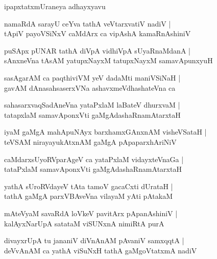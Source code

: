 \documentclass[twoside,12pt,openright]{book}
\newcounter{shloka}[chapter]
\begin{document}
\begin{center}
ipapxtatxmUraneya adhayxyavu
\end{center}

\begin{shloka}%
namaRdA sarayU ceYva tathA veVtarxvatiV nadiV |\\
tApiV payoVSiNxV caMdArx ca vipAshA kamaRnAshiniV 
\end{shloka}

\begin{shloka}%
puSApx pUNAR tathA diVpA vidhiVpA sUyaRnaMdanA |\\
sAnxneVna tAsAM yatupxNayxM tatupxNayxM samavApunxyuH 
\end{shloka}

\begin{shloka}%
sasAgarAM ca paqthiviVM yeV dadaMti maniVSiNaH |\\
gavAM dAnasahsaserxVNa ashavxmeVdhashateVna ca 
\end{shloka}

\begin{shloka}%
sahasarxvaqSadAneVna yataPxlaM laBateV dhurxvaM |\\
tatapxlaM samavAponxVti gaMgAdashaRnamAtarxtaH 
\end{shloka}

\begin{shloka}%
iyaM gaMgA mahApuNAyx barxhamxGAnxnAM visheVSataH |\\
teVSAM nirayayukAtxnAM gaMgA pApaparxhAriNiV 
\end{shloka}

\begin{shloka}%
caMdarxsUyoRVparAgeV ca yataPxlaM vidayxteVnaGa |\\
tataPxlaM samavAponxVti gaMgAdashaRnamAtarxtaH 
\end{shloka}

\begin{shloka}%
yathA sUroRVdayeV tAta tamoV gacaCxti dUrataH |\\
tathA gaMgA parxVBAveVna vilayaM yAti pAtakaM 
\end{shloka}

\begin{shloka}%
mAteVyaM savaRdA loVkeV pavitArx pApanAshiniV |\\
kalAyxNarUpA satataM viSUNxnA nimiRtA purA 
\end{shloka}

\begin{shloka}%
divayxrUpA tu jananiV diVnAnAM pAvaniV samxqqtA |\\
deVvAnAM ca yathA viSuNxH tathA gaMgoVtatxmA nadiV 
\end{shloka}
\end{document}
